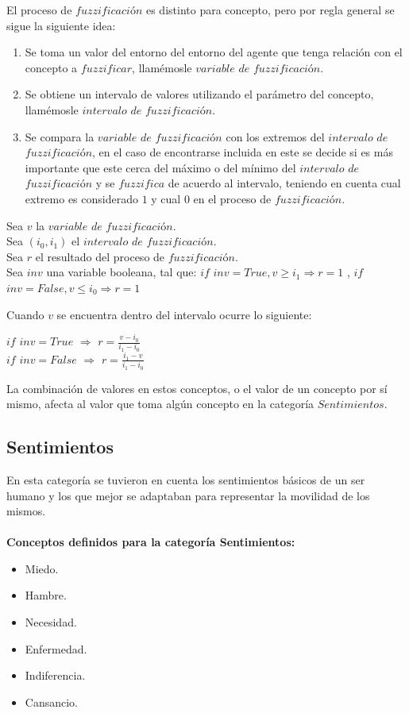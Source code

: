 El proceso de $fuzzificación$ es distinto para concepto, pero por regla general se sigue la siguiente idea:\\
\begin{enumerate}
    \item Se toma un valor del entorno del entorno del agente que tenga relación con el concepto a $fuzzificar$, llamémosle $variable$ $de$ $fuzzificación$.
    \item Se obtiene un intervalo de valores utilizando el parámetro del concepto, llamémosle $intervalo$ $de$ $fuzzificación$.
    \item Se compara la $variable$ $de$ $fuzzificación$ con los extremos del $intervalo$ $de$ $fuzzificación$, en el caso de encontrarse incluida en este se decide si es más importante que este cerca del máximo o del mínimo del $intervalo$ $de$ $fuzzificación$ y se $fuzzifica$ de acuerdo al intervalo, teniendo en cuenta cual extremo es considerado $1$ y cual $0$ en el proceso de $fuzzificación$.
\end{enumerate}

\begin{center}
    Sea $v$ la $variable$ $de$ $fuzzificación$.\\
    Sea $(i_0, i_1)$ el $intervalo$ $de$ $fuzzificación$.\\
    Sea $r$ el resultado del proceso de $fuzzificación$.\\
    Sea $inv$ una variable booleana, tal que: $if$ $inv = True, v \geq i_1 \Rightarrow r = 1$ , $if$ $inv = False, v \leq i_0 \Rightarrow r = 1$\\
\end{center}
    Cuando $v$ se encuentra dentro del intervalo ocurre lo siguiente:\\
\begin{center}
    $if$ $inv = True$ $\Rightarrow$ $r = \frac{v - i_0}{i_1 - i_0}$\\
    $if$ $inv = False$ $\Rightarrow$ $r = \frac{i_1 - v}{i_1 - i_0}$
\end{center}

La combinación de valores en estos conceptos, o el valor de un concepto por sí mismo, afecta al valor que toma algún
concepto en la categoría $Sentimientos$.\\

\subsection{Sentimientos}
En esta categoría se tuvieron en cuenta los sentimientos básicos de un ser humano y los que mejor se adaptaban para
representar la movilidad de los mismos.\\
\\
\textbf{Conceptos definidos para la categoría Sentimientos:}
\begin{itemize}
    \item Miedo.
    \item Hambre.
    \item Necesidad.
    \item Enfermedad.
    \item Indiferencia.
    \item Cansancio.
\end{itemize}

